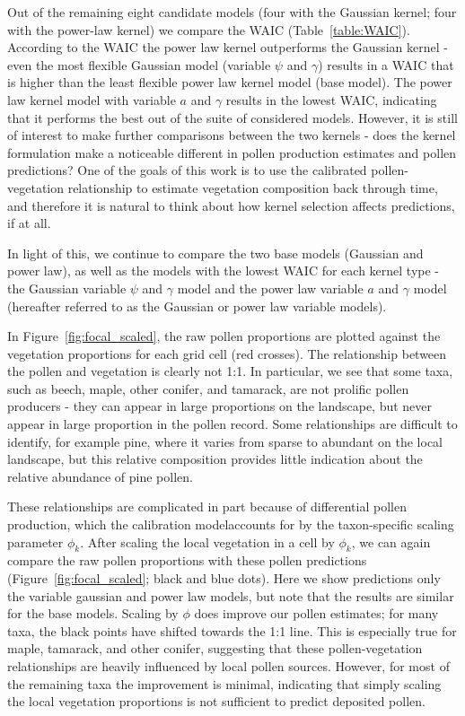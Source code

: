 \documentclass[12pt]{article}
\begin{document}
Out of the remaining eight candidate models (four with the Gaussian
kernel; four with the power-law kernel) we compare the WAIC
(Table~\ref{table:WAIC}). According to the WAIC the power law kernel
outperforms the Gaussian kernel - even the most flexible Gaussian
model (variable $\psi$ and $\gamma$) results in a WAIC that is higher
than the least flexible power law kernel model (base model). The power
law kernel model with variable $a$ and $\gamma$ results in the lowest
WAIC, indicating that it performs the best out of the suite of
considered models. However, it is still of interest to make further
comparisons between the two kernels - does the kernel formulation make
a noticeable different in pollen production estimates and pollen
predictions? One of the goals of this work is to use the calibrated
pollen-vegetation relationship to estimate vegetation composition back
through time, and therefore it is natural to think about how kernel
selection affects predictions, if at all.

In light of this, we continue to compare the two base models (Gaussian
and power law), as well as the models with the lowest WAIC for each
kernel type - the Gaussian variable $\psi$ and $\gamma$ model and the
power law variable $a$ and $\gamma$ model (hereafter referred to as
the Gaussian or power law variable models).

In Figure~\ref{fig:focal_scaled}, the raw pollen proportions are
plotted against the vegetation proportions for each grid cell (red
crosses). The relationship between the pollen and vegetation is
clearly not 1:1. In particular, we see that some taxa, such as beech,
maple, other conifer, and tamarack, are not prolific pollen producers
- they can appear in large proportions on the landscape, but never
appear in large proportion in the pollen record. Some relationships
are difficult to identify, for example pine, where it varies from
sparse to abundant on the local landscape, but this relative
composition provides little indication about the relative abundance of
pine pollen.

These relationships are complicated in part because of differential
pollen production, which the calibration modelaccounts for by the
taxon-specific scaling parameter $\phi_k$. After scaling the local
vegetation in a cell by $\phi_k$, we can again compare the raw pollen
proportions with these pollen predictions
(Figure~\ref{fig:focal_scaled}; black and blue dots). Here we show
predictions only the variable gaussian and power law models, but note
that the results are similar for the base models. Scaling by $\phi$
does improve our pollen estimates; for many taxa, the black points
have shifted towards the 1:1 line. This is especially true for maple,
tamarack, and other conifer, suggesting that these pollen-vegetation
relationships are heavily influenced by local pollen sources. However,
for most of the remaining taxa the improvement is minimal, indicating
that simply scaling the local vegetation proportions is not sufficient
to predict deposited pollen.
\end{document}
